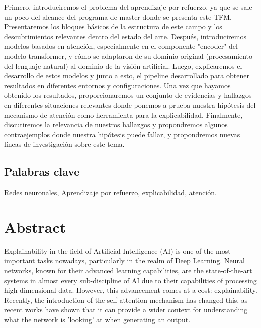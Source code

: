 Primero, introduciremos el problema del aprendizaje por refuerzo, ya que se sale un poco del alcance del programa de master donde se presenta este TFM. Presentaremos los bloques básicos de la estructura de este campo y los descubrimientos relevantes dentro del estado del arte. Después, introduciremos modelos basados en atención, especialmente en el componente "encoder" del modelo transformer, y cómo se adaptaron de su dominio original (procesamiento del lenguaje natural) al dominio de la visión artificial. Luego, explicaremos el desarrollo de estos modelos y junto a esto, el pipeline desarrollado para obtener resultados en diferentes entornos y configuraciones. Una vez que hayamos obtenido los resultados, proporcionaremos un conjunto de evidencias y hallazgos en diferentes situaciones relevantes donde ponemos a prueba nuestra hipótesis del mecanismo de atención como herramienta para la explicabilidad. Finalmente, discutiremos la relevancia de nuestros hallazgos y propondremos algunos contraejemplos donde nuestra hipótesis puede fallar, y propondremos nuevas líneas de investigación sobre este tema.

\vfill
\section*{Palabras clave}
Redes neuronales, Aprendizaje por refuerzo, explicabilidad, atención.

\newpage
\chapter*{Abstract}
Explainability in the field of Artificial Intelligence (AI) is one of the most important tasks nowadays, particularly in the realm of Deep Learning. Neural networks, known for their advanced learning capabilities, are the state-of-the-art systems in almost every sub-discipline of AI due to their capabilities of processing high-dimensional data. However, this advancement comes at a cost: explainability. Recently, the introduction of the self-attention mechanism has changed this, as recent works have shown that it can provide a wider context for understanding what the network is 'looking' at when generating an output.

